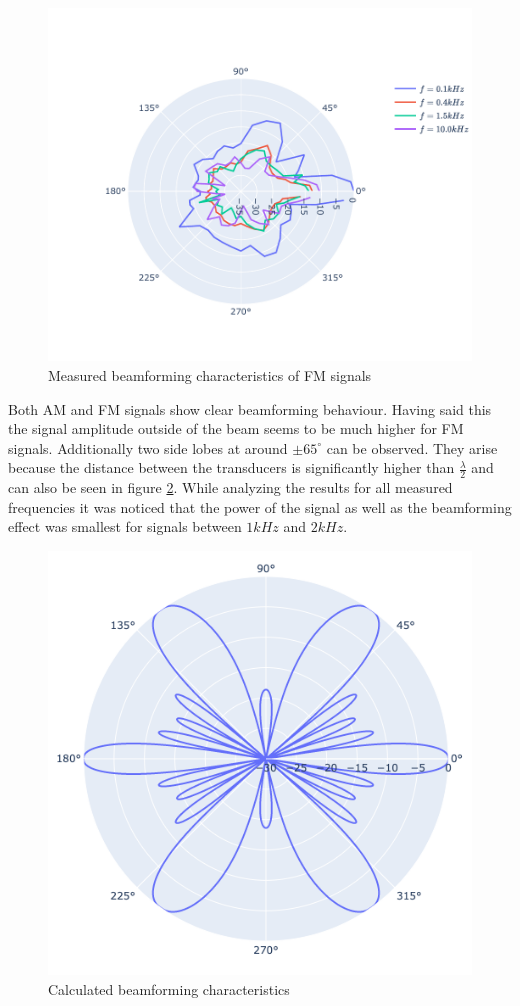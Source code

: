 \begin{figure}
  \centering
  \includegraphics[height=\largeheight]{src/assets/pictures/measurements/beamforming_fm_polar.pdf}
  \caption{Measured beamforming characteristics of FM signals}\label{fig:meas:beam:polar_meas_fm}
\end{figure}
\p
Both AM and FM signals show clear beamforming behaviour. Having said this the signal amplitude outside of the beam seems to be much higher for FM signals. Additionally two side lobes at around $\pm 65^\circ$ can be observed. They arise because the distance between the transducers is significantly higher than $\frac{\lambda}{2}$ and can also be seen in figure \ref{fig:meas:beam:polar_calc}. While analyzing the results for all measured frequencies it was noticed that the power of the signal as well as the beamforming effect was smallest for signals between $1kHz$ and $2kHz$.
%
\begin{figure}
  \centering
  \includegraphics[height=\mediumheight]{src/assets/pictures/measurements/beamforming_calc_polar.png}
  \caption{Calculated beamforming characteristics}\label{fig:meas:beam:polar_calc}
\end{figure}